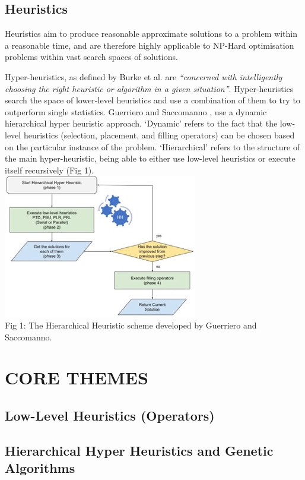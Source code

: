 \documentclass{llncs}
\begin{document}
\subsection{Heuristics}
Heuristics aim to produce reasonable approximate solutions to a problem within a reasonable time, and are therefore highly applicable to NP-Hard optimisation problems within vast search spaces of solutions.

Hyper-heuristics, as defined by Burke et al. are \emph{“concerned with intelligently choosing the right heuristic or algorithm in a given situation”}\cite{burke2003hyper}. Hyper-heuristics search the space of lower-level heuristics and use a combination of them to try to outperform single statistics. Guerriero and Saccomanno \cite{guerriero2022hierarchical}, use a dynamic hierarchical hyper heuristic approach. ‘Dynamic’ refers to the fact that the low-level heuristics (selection, placement, and filling operators) can be chosen based on the particular instance of the problem. ‘Hierarchical’ refers to the structure of the main hyper-heuristic, being able to either use low-level heuristics or execute itself recursively (Fig 1). \\

\includegraphics{hierarchical.jpeg} \\
\caption{Fig 1: The Hierarchical Heuristic scheme developed by Guerriero and Saccomanno.}


\section{CORE THEMES}


\subsection{Low-Level Heuristics (Operators)}
\subsection{Hierarchical Hyper Heuristics and Genetic Algorithms}
\end{document}
